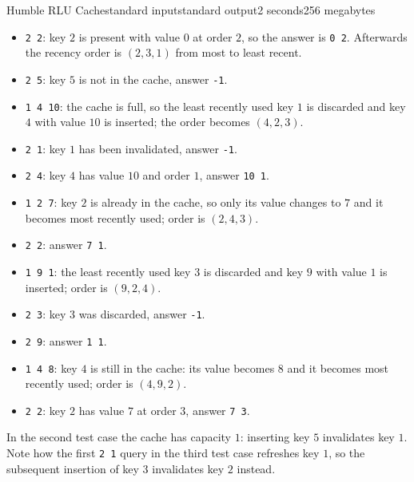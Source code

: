 \begin{problem}{Humble RLU Cache}{standard input}{standard output}{2 seconds}{256 megabytes}
\begin{itemize}
  \item \texttt{2 2}: key $2$ is present with value $0$ at order $2$, so the answer is \texttt{0 2}. Afterwards the recency order is $(2, 3, 1)$ from most to least recent.
  \item \texttt{2 5}: key $5$ is not in the cache, answer \texttt{-1}.
  \item \texttt{1 4 10}: the cache is full, so the least recently used key $1$ is discarded and key $4$ with value $10$ is inserted; the order becomes $(4, 2, 3)$.
  \item \texttt{2 1}: key $1$ has been invalidated, answer \texttt{-1}.
  \item \texttt{2 4}: key $4$ has value $10$ and order $1$, answer \texttt{10 1}.
  \item \texttt{1 2 7}: key $2$ is already in the cache, so only its value changes to $7$ and it becomes most recently used; order is $(2, 4, 3)$.
  \item \texttt{2 2}: answer \texttt{7 1}.
  \item \texttt{1 9 1}: the least recently used key $3$ is discarded and key $9$ with value $1$ is inserted; order is $(9, 2, 4)$.
  \item \texttt{2 3}: key $3$ was discarded, answer \texttt{-1}.
  \item \texttt{2 9}: answer \texttt{1 1}.
  \item \texttt{1 4 8}: key $4$ is still in the cache: its value becomes $8$ and it becomes most recently used; order is $(4, 9, 2)$.
  \item \texttt{2 2}: key $2$ has value $7$ at order $3$, answer \texttt{7 3}.
\end{itemize}

In the second test case the cache has capacity $1$: inserting key $5$ invalidates key $1$. Note how the first \texttt{2 1} query in the third test case refreshes key $1$, so the subsequent insertion of key $3$ invalidates key $2$ instead.


\end{problem}

